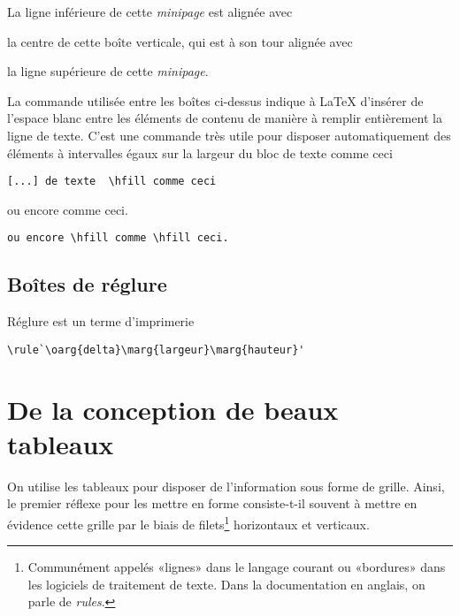 \noindent%
\begin{minipage}{\textwidth}
  \begin{minipage}[b]{0.3\textwidth}
    La ligne inférieure de cette \emph{minipage} est alignée avec
  \end{minipage}
  \hfill
  \parbox{0.3\textwidth}{la centre de cette boîte verticale, qui est à
    son tour alignée avec}
  \hfill
  \begin{minipage}[t]{0.3\textwidth}
    la ligne supérieure de cette \emph{minipage}.
  \end{minipage}
\end{minipage}
\medskip

La commande \cmd{\hfill} utilisée entre les boîtes ci-dessus indique à
{\LaTeX} d'insérer de l'espace blanc entre les éléments de contenu de
manière à remplir entièrement la ligne de texte. C'est une commande
très utile pour disposer automatiquement des éléments à intervalles
égaux sur la largeur du bloc de texte \hfill comme ceci
\begin{lstlisting}
[...] de texte  \hfill comme ceci
\end{lstlisting}
ou encore \hfill comme \hfill ceci.
\begin{lstlisting}
ou encore \hfill comme \hfill ceci.
\end{lstlisting}


\subsection{Boîtes de réglure}

Réglure est un terme d'imprimerie

\begin{lstlisting}
\rule`\oarg{delta}\marg{largeur}\marg{hauteur}'
\end{lstlisting}


\section{De la conception de beaux tableaux}
\label{sec:tableaux:booktabs}

On utilise les tableaux pour disposer de l'information sous forme de
grille. Ainsi, le premier réflexe pour les mettre en forme
consiste-t-il souvent à mettre en évidence cette grille par le biais
de filets\footnote{%
  Communément appelés «lignes» dans le langage courant ou «bordures»
  dans les logiciels de traitement de texte. Dans la documentation en
  anglais, on parle de \emph{rules}.} %
horizontaux et verticaux.

